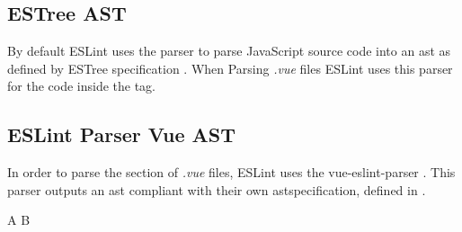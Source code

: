 \subsection{ESTree AST}
By default ESLint uses the \parencite{eslintEspree} parser to parse JavaScript source code into an \gls{ast} as defined by ESTree specification \parencite{estreeASTSpec}. When Parsing \textit{.vue} files ESLint uses this parser for the code inside the  tag.
  
\subsection{ESLint Parser Vue AST}
In order to parse the  section of \textit{.vue} files, ESLint uses the vue-eslint-parser \parencite{eslint_vue_parser}. This parser outputs an  \gls{ast} compliant with their own  \gls{ast}specification, defined in \parencite{eslint_vue_parser_ast}.


A
\label{eslint:object_expression}
B
\label{eslint:property}

\label{eslint:velement}

\label{eslint:identifier}
\label{eslint:member_expression}
\label{eslint:call_expression}